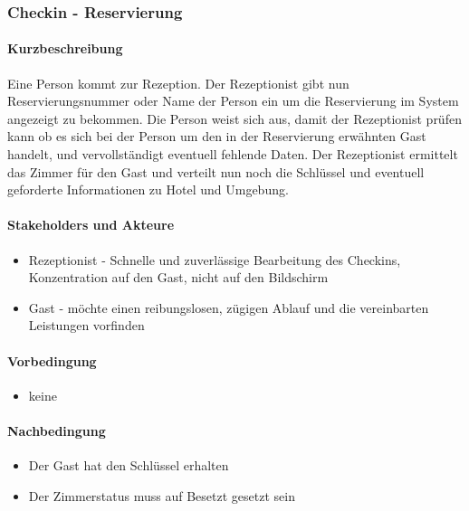 \subsubsection{Checkin - Reservierung}
\label{UseCase_CheckinReservierung}

\paragraph{Kurzbeschreibung}
Eine Person kommt zur \Gls{Rezeption}. Der \Gls{Rezeptionist} gibt nun \Gls{Reservierungsnummer} oder Name der Person ein um die \Gls{Reservierung} im System angezeigt zu bekommen. Die Person weist sich aus, damit der \Gls{Rezeptionist} prüfen kann ob es sich bei der Person um den in der Reservierung erwähnten \Gls{Gast} handelt, und vervollständigt eventuell fehlende Daten. Der \Gls{Rezeptionist} ermittelt das \Gls{Zimmer} für den \Gls{Gast} und verteilt nun noch die Schlüssel und eventuell geforderte Informationen zu Hotel und Umgebung.

\paragraph{Stakeholders und Akteure}
\begin{itemize}
	\item \Gls{Rezeptionist} - Schnelle und zuverlässige Bearbeitung des \Gls{Checkin}s, Konzentration auf den \Gls{Gast}, nicht auf den Bildschirm
	\item \Gls{Gast} - möchte einen reibungslosen, zügigen Ablauf und die vereinbarten Leistungen vorfinden
\end{itemize}

\paragraph{Vorbedingung}
\begin{itemize}
	\item keine
\end{itemize}

\paragraph{Nachbedingung}
\begin{itemize}
	\item Der Gast hat den Schlüssel erhalten
	\item Der Zimmerstatus muss auf Besetzt gesetzt sein
\end{itemize}
